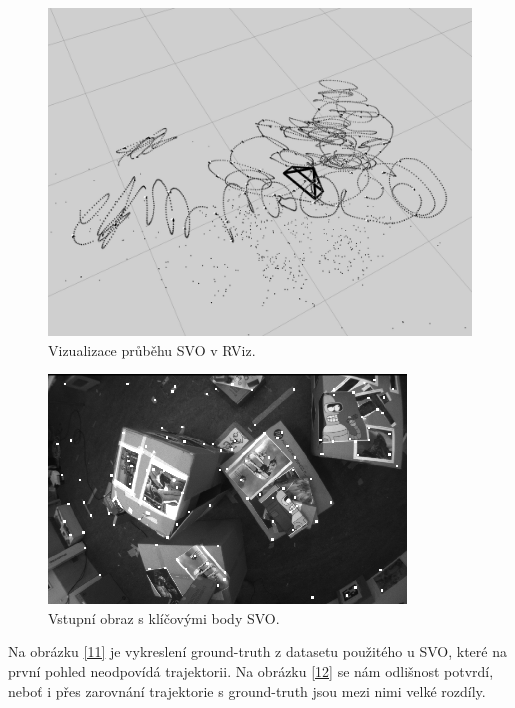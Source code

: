 \documentclass[12pt,a4paper]{report}
\begin{document}
\begin{figure}[H]
\centering
\includegraphics[scale=0.5]{img/SVO_rviz_1.png}
\caption{Vizualizace průběhu SVO v RViz.}
\label{9}
\end{figure}

\begin{figure}[H]
\centering
\includegraphics[scale=1]{img/SVO_rviz_2.png}
\caption{Vstupní obraz s klíčovými body SVO.}
\label{10}
\end{figure}

Na obrázku \ref{11} je vykreslení ground-truth z datasetu použitého u SVO, které na první pohled neodpovídá trajektorii. Na obrázku \ref{12} se nám odlišnost potvrdí, neboť i přes zarovnání trajektorie s ground-truth jsou mezi nimi velké rozdíly.
\end{document}
